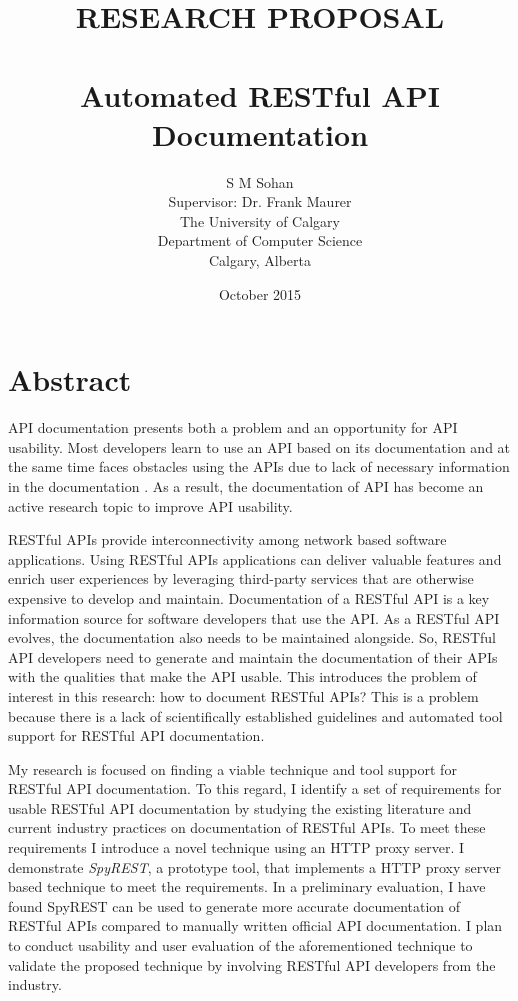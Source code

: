 \documentclass[11pt,oneside]{book}
\begin{document}
\title{RESEARCH PROPOSAL \\ $ $ \\
Automated RESTful API Documentation}

\author{S M Sohan \\
Supervisor: Dr. Frank Maurer \\
The University of Calgary \\
Department of Computer Science \\
Calgary, Alberta
}

\date{October 2015}


\maketitle
\tableofcontents
\frontmatter

% 

\chapter*{Abstract}
API documentation presents both a problem and an opportunity for API usability. Most developers learn to use an API based on its documentation and at the same time faces obstacles using the APIs due to lack of necessary information in the documentation \cite{Robillard_what_makes}. As a result, the documentation of API has become an active research topic to improve API usability.

RESTful APIs provide interconnectivity among network based software applications. Using RESTful APIs applications can deliver valuable features and enrich user experiences by leveraging third-party services that are otherwise expensive to develop and maintain. Documentation of a RESTful API is a key information source for software developers that use the API. As a RESTful API evolves, the documentation also needs to be maintained alongside. So, RESTful API developers need to generate and maintain the documentation of their APIs with the qualities that make the API usable. This introduces the problem of interest in this research: how to document RESTful APIs? This is a problem because there is a lack of scientifically established guidelines and automated tool support for RESTful API documentation.

My research is focused on finding a viable technique and tool support for RESTful API documentation. To this regard, I identify a set of requirements for usable RESTful API documentation by studying the existing literature and current industry practices on documentation of RESTful APIs. To meet these requirements I introduce a novel technique using an HTTP proxy server. I demonstrate \emph{SpyREST}, a prototype tool, that implements a HTTP proxy server based technique to meet the requirements. In a preliminary evaluation, I have found SpyREST can be used to generate more accurate documentation of RESTful APIs compared to manually written official API documentation. I plan to conduct usability and user evaluation of the aforementioned technique to validate the proposed technique by involving RESTful API developers from the industry.
\end{document}
